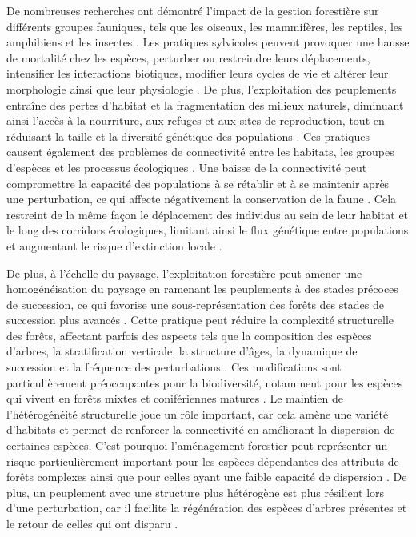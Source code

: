 De nombreuses recherches ont démontré l'impact de la gestion forestière sur différents groupes fauniques, tels que les oiseaux, les mammifères, les reptiles, les amphibiens et les insectes \citep{Drapeau2000LandscapeScaleDisturbances,Suffice2015Shorttermeffects,bouchardBeetleCommunityResponse2016b,Hughes2019Impactnatural,Mazerolle2021Woodlandsalamander}. 
Les pratiques sylvicoles peuvent provoquer une hausse de mortalité chez les espèces, perturber ou restreindre leurs déplacements, intensifier les interactions biotiques, modifier leurs cycles de vie et altérer leur morphologie ainsi que leur physiologie \citep{Sergio2018Animalresponses}. 
De plus, l'exploitation des peuplements entraîne des pertes d'habitat et la fragmentation des milieux naturels, diminuant ainsi l'accès à la nourriture, aux refuges et aux sites de reproduction, tout en réduisant la taille et la diversité génétique des populations \citep{Bouderbala2023Longtermeffect}.
Ces pratiques causent également des problèmes de connectivité entre les habitats, les groupes d'espèces et les processus écologiques \citep{Lindenmayer2006Generalmanagement}. 
Une baisse de la connectivité peut compromettre la capacité des populations à se rétablir et à se maintenir après une perturbation, ce qui affecte négativement la conservation de la faune \citep{Lamberson1994ReserveDesign}. 
Cela restreint de la même façon le déplacement des individus au sein de leur habitat et le long des corridors écologiques, limitant ainsi le flux génétique entre populations et augmentant le risque d'extinction locale \citep{Saccheri1998Inbreedingextinction}. 

De plus, à l’échelle du paysage, l'exploitation forestière peut amener une homogénéisation du paysage en ramenant les peuplements à des stades précoces de succession, ce qui favorise une sous-représentation des forêts des stades de succession plus avancés \citep{Cyr2009Forestmanagement,Boucher2017Cumulativepatterns}. 
Cette pratique peut réduire la complexité structurelle des forêts, affectant parfois des aspects tels que la composition des espèces d'arbres, la stratification verticale, la structure d'âges, la dynamique de succession et la fréquence des perturbations \citep{Bergeron2000Speciesstand,Commarmot2005Structurevirgin,Varga2005Treesizediversity}. 
Ces modifications sont particulièrement préoccupantes pour la biodiversité, notamment pour les espèces qui vivent en forêts mixtes et conifériennes matures \citep{Tremblay2018Harvestinginteracts,Cadieux2020Projectedeffects}.
Le maintien de l'hétérogénéité structurelle joue un rôle important, car cela amène une variété d'habitats et permet de renforcer la connectivité en améliorant la dispersion de certaines espèces. 
C’est pourquoi l’aménagement forestier peut représenter un risque particulièrement important pour les espèces dépendantes des attributs de forêts complexes ainsi que pour celles ayant une faible capacité de dispersion  \citep{Norden2001Conceptualproblems,Martin2021indicatorspecies}. 
De plus, un peuplement avec une structure plus hétérogène est plus résilient lors d'une perturbation, car il facilite la régénération des espèces d'arbres présentes et le retour de celles qui ont disparu \citep{Kuuluvainen2009Forestmanagement}. 

